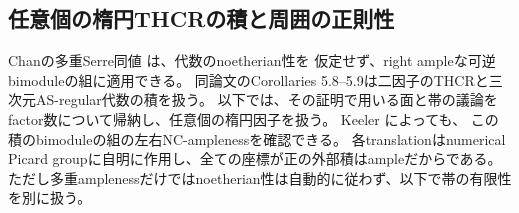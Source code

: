 \subsection{任意個の楕円THCRの積と周囲の正則性}

Chanの多重Serre同値 \cite[Theorem 3.4]{ChanMulti} は、代数のnoetherian性を
仮定せず、right ampleな可逆bimoduleの組に適用できる。
同論文のCorollaries 5.8--5.9は二因子のTHCRと三次元AS-regular代数の積を扱う。
以下では、その証明で用いる面と帯の議論をfactor数について帰納し、任意個の楕円因子を扱う。
Keeler \cite[Theorem 2.7, Corollary 2.8]{KeelerMulti} によっても、
この積のbimoduleの組の左右NC-amplenessを確認できる。
各translationはnumerical Picard groupに自明に作用し、全ての座標が正の外部積はampleだからである。
ただし多重amplenessだけではnoetherian性は自動的に従わず、以下で帯の有限性を別に扱う。

